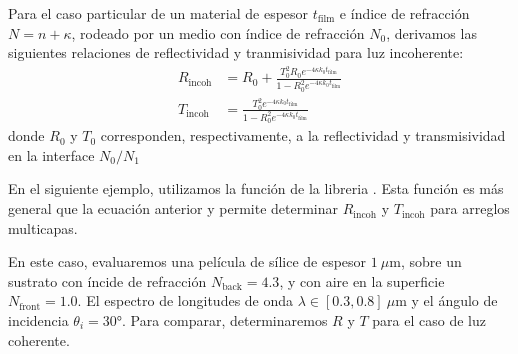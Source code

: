 \documentclass[letterpaper,10pt,english]{jupyterBook}
\begin{document}
\sphinxAtStartPar
Para el caso particular de un material de espesor \(t_\mathrm{film}\) e índice de refracción \(N = n + \kappa\), rodeado por un medio con índice de refracción \(N_0\), derivamos las siguientes relaciones de reflectividad y tranmisividad para luz incoherente:
\label{equation:5_TransporteRadiativo/5_TransporteRadiativo:367f64b8-037b-440e-a144-518b71440410}\begin{align}
R_\mathrm{incoh}&= R_0 + \frac{T_0^2R_0e^{-4\kappa k_0 t_\mathrm{film}}}{1 - R_0^2e^{-4\kappa k_0 t_\mathrm{film}}} 
\\[10pt]
T_\mathrm{incoh} &= \frac{T_0^2e^{-4\kappa k_0 t_\mathrm{film}}}{1 - R_0^2e^{-4\kappa k_0 t_\mathrm{film}}}
\end{align}
\sphinxAtStartPar
donde \(R_0\) y \(T_0\) corresponden, respectivamente, a la reflectividad y transmisividad en la interface \(N_0 / N_1\)

\sphinxAtStartPar
En el siguiente ejemplo, utilizamos la función  de la libreria . Esta función es más general que la ecuación anterior y permite determinar \(R_\mathrm{incoh}\) y \(T_\mathrm{incoh}\) para arreglos multicapas.

\sphinxAtStartPar
En este caso, evaluaremos una película de sílice de espesor \(1~\mu\mathrm{m}\), sobre un sustrato con íncide de refracción \(N_\mathrm{back} = 4.3\), y con aire en la superficie \(N_\mathrm{front} = 1.0\). El espectro de longitudes de onda \(\lambda\in[0.3,0.8]~\mu\mathrm{m}\) y el ángulo de incidencia \(\theta_i = 30°\). Para comparar, determinaremos \(R\) y \(T\) para el caso de luz coherente.
\end{document}
